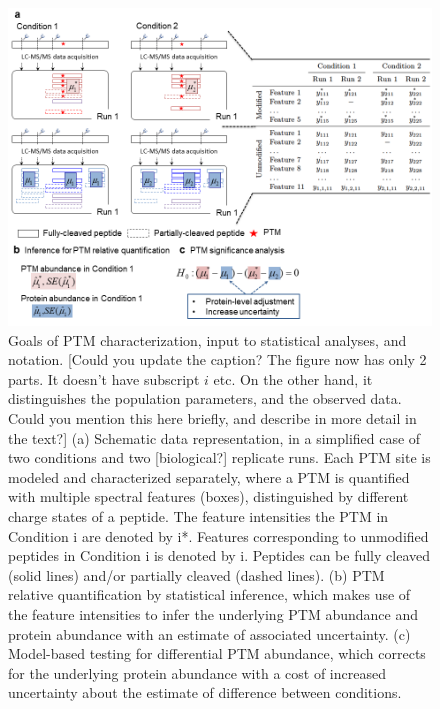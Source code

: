 \documentclass[mcp]{article}
\numberwithin{table}{section}
\def\todo#1{{\color{red}[#1]}}
\begin{document}
\begin{figure}[ht]
\centering
\includegraphics[scale=.6]{images/fig3.png}
\caption{
Goals of PTM characterization, input to statistical analyses, and notation. \todo{Could you update the caption? The figure now has only 2 parts. It doesn't have subscript $i$ etc. On the other hand, it distinguishes the population parameters, and the observed data. Could you mention this here briefly, and describe in more detail in the text?}  (a) Schematic data representation, in a simplified case of two conditions and two \todo{biological?} replicate runs. Each PTM site is modeled and characterized separately, where a PTM is quantified with multiple spectral features (boxes), distinguished by different charge states of a peptide. The feature intensities the PTM in Condition i are denoted by i*. Features corresponding to unmodified peptides in Condition i is denoted by i. Peptides can be fully cleaved (solid lines) and/or partially cleaved (dashed lines). (b) PTM relative quantification by statistical inference, which makes use of the feature intensities to infer the underlying PTM abundance and protein abundance with an estimate of associated uncertainty. (c) Model-based testing for differential PTM abundance, which corrects for the underlying protein abundance with a cost of increased uncertainty about the estimate of difference between conditions.}
\label{fig:data-structure}
\end{figure}
\end{document}
